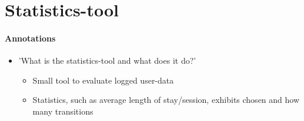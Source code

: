 
\section{Statistics-tool}
\label{implementation_tool}

\paragraph{Annotations}

\begin{itemize}
	\item 'What is the statistics-tool and what does it do?'
	\begin{itemize}
		\item Small tool to evaluate logged user-data
		\item Statistics, such as average length of stay/session, exhibits chosen and how many transitions 
	\end{itemize}
\end{itemize}

